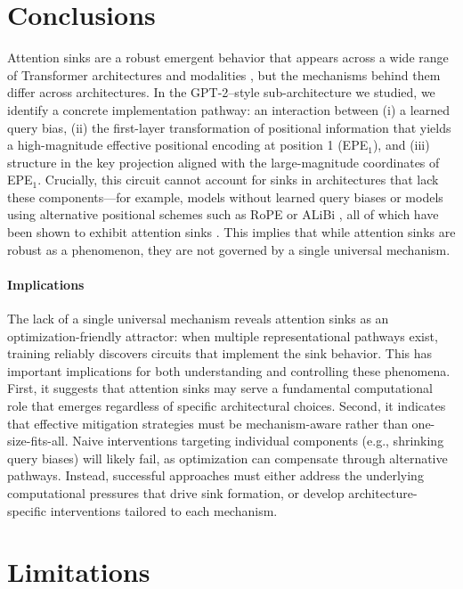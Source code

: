 \documentclass[11pt]{article}
\newif\ifYRMcomments
\newcommand{\YRM}[1]{\ifYRMcomments\textcolor{red}{[YRM: #1]}\fi}
\begin{document}
\section{Conclusions}
Attention sinks are a robust emergent behavior that appears across a wide range of Transformer architectures and modalities \YRM{cite all relevant papers from RW}, but the mechanisms behind them differ across architectures. In the GPT-2–style sub-architecture we studied, we identify a concrete implementation pathway: an interaction between (i) a learned query bias, (ii) the first-layer transformation of positional information that yields a high-magnitude effective positional encoding at position 1 (EPE$_1$), and (iii) structure in the key projection aligned with the large-magnitude coordinates of EPE$_1$. Crucially, this circuit cannot account for sinks in architectures that lack these components—for example, models without learned query biases or models using alternative positional schemes such as RoPE or ALiBi \YRM{cite both}, all of which have been shown to exhibit attention sinks \YRM{cite all relevant papers from RW}. This implies that while attention sinks are robust as a phenomenon, they are not governed by a single universal mechanism.

\paragraph{Implications}
The lack of a single universal mechanism reveals attention sinks as an optimization-friendly attractor: when multiple representational pathways exist, training reliably discovers circuits that implement the sink behavior. This has important implications for both understanding and controlling these phenomena. First, it suggests that attention sinks may serve a fundamental computational role that emerges regardless of specific architectural choices. Second, it indicates that effective mitigation strategies must be mechanism-aware rather than one-size-fits-all. Naive interventions targeting individual components (e.g., shrinking query biases) will likely fail, as optimization can compensate through alternative pathways. Instead, successful approaches must either address the underlying computational pressures that drive sink formation, or develop architecture-specific interventions tailored to each mechanism. 



\section{Limitations}
\end{document}
